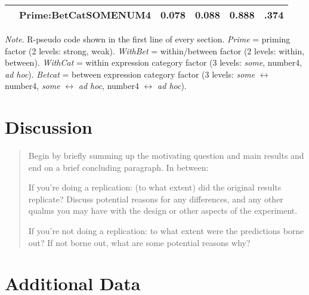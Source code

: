 \documentclass[10pt]{article}
\begin{document}
\begin{multicols}{2}
\begin{table*}[ht]
\begin{center}
\begin{tabular}{llrrrr}
      & Prime:BetCatSOMENUM4 & 0.078 & 0.088 & 0.888 & .374 \\
      \hline
    \end{tabular}
\end{center}
\emph{Note}. R-pseudo code shown in the first line of every section.
  \emph{Prime} = priming factor (2 levels: strong, weak).
  \emph{WithBet} = within/between factor (2 levels: within, between).
  \emph{WithCat} = within expression category factor (3 levels: \emph{some}, number4, \emph{ad hoc}).
  \emph{Betcat} = between expression category factor (3 levels: \emph{some} \(\leftrightarrow\) number4, \emph{some} \(\leftrightarrow\) \emph{ad hoc}, number4 \(\leftrightarrow\) \emph{ad hoc}).
\end{table*}


\section{Discussion}
\label{sec:discussion}

\begin{quote}
  Begin by briefly summing up the motivating question and main results and end on a brief concluding paragraph. In between:

  If you're doing a replication: (to what extent) did the original results replicate? Discuss potential reasons for any differences, and any other qualms you may have with the design or other aspects of the experiment.

  If you're not doing a replication: to what extent were the predictions borne out? If not borne out, what are some potential reasons why?
\end{quote}

\end{multicols}

\vfill
\printbibliography









\newpage
\appendix
\section{Additional Data}
\end{document}
